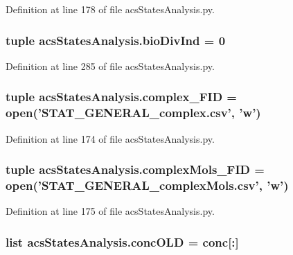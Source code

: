 Definition at line 178 of file acs\-States\-Analysis.\-py.

\hypertarget{a00099_a247328d05f06695b0c2de9a001ca4548}{
\subsubsection[{bio\-Div\-Ind}]{\setlength{\rightskip}{0pt plus 5cm}tuple acs\-States\-Analysis.\-bio\-Div\-Ind = 0}}\label{a00099_a247328d05f06695b0c2de9a001ca4548}


Definition at line 285 of file acs\-States\-Analysis.\-py.

\hypertarget{a00099_ace41560d233dff88c3073be734bae944}{
\subsubsection[{complex\-\_\-\-F\-I\-D}]{\setlength{\rightskip}{0pt plus 5cm}tuple acs\-States\-Analysis.\-complex\-\_\-\-F\-I\-D = open('S\-T\-A\-T\-\_\-\-G\-E\-N\-E\-R\-A\-L\-\_\-complex.\-csv', 'w')}}\label{a00099_ace41560d233dff88c3073be734bae944}


Definition at line 174 of file acs\-States\-Analysis.\-py.

\hypertarget{a00099_a2ef28958c50aabe7867b32f8dd6f4ace}{
\subsubsection[{complex\-Mols\-\_\-\-F\-I\-D}]{\setlength{\rightskip}{0pt plus 5cm}tuple acs\-States\-Analysis.\-complex\-Mols\-\_\-\-F\-I\-D = open('S\-T\-A\-T\-\_\-\-G\-E\-N\-E\-R\-A\-L\-\_\-complex\-Mols.\-csv', 'w')}}\label{a00099_a2ef28958c50aabe7867b32f8dd6f4ace}


Definition at line 175 of file acs\-States\-Analysis.\-py.

\hypertarget{a00099_a15f99c617a2dc95e52f741ee99e71b7a}{
\subsubsection[{conc\-O\-L\-D}]{\setlength{\rightskip}{0pt plus 5cm}list acs\-States\-Analysis.\-conc\-O\-L\-D = {\bf conc}\mbox{[}\-:\mbox{]}}}\label{a00099_a15f99c617a2dc95e52f741ee99e71b7a}


